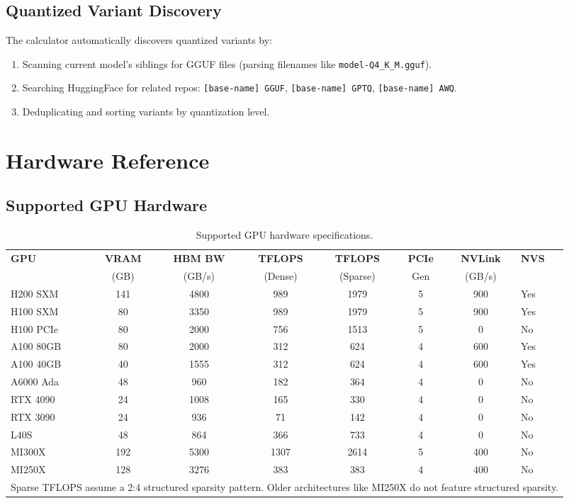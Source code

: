 \documentclass[11pt,a4paper]{article}
\theoremstyle{definition}
\begin{document}
\subsection{Quantized Variant Discovery}

The calculator automatically discovers quantized variants by:
\begin{enumerate}
  \item Scanning current model's siblings for GGUF files (parsing filenames like \texttt{model-Q4\_K\_M.gguf}).
  \item Searching HuggingFace for related repos: \texttt{[base-name] GGUF}, \texttt{[base-name] GPTQ}, \texttt{[base-name] AWQ}.
  \item Deduplicating and sorting variants by quantization level.
\end{enumerate}

\section{Hardware Reference}

\subsection{Supported GPU Hardware}

\begin{table}[htbp]
\centering
\caption{Supported GPU hardware specifications.}\label{tab:gpus}
\begin{tabularx}{\textwidth}{lccccccX}
\toprule
\textbf{GPU} & \textbf{VRAM} & \textbf{HBM BW} & \textbf{TFLOPS} & \textbf{TFLOPS} & \textbf{PCIe} & \textbf{NVLink} & \textbf{NVS} \\
 & (GB) & (GB/s) & (Dense) & (Sparse) & Gen & (GB/s) & \\
\midrule
H200 SXM  & 141 & 4800 & 989  & 1979 & 5 & 900 & Yes \\
H100 SXM  & 80  & 3350 & 989  & 1979 & 5 & 900 & Yes \\
H100 PCIe & 80  & 2000 & 756  & 1513 & 5 & 0   & No  \\
A100 80GB & 80  & 2000 & 312  & 624  & 4 & 600 & Yes \\
A100 40GB & 40  & 1555 & 312  & 624  & 4 & 600 & Yes \\
A6000 Ada & 48  & 960  & 182  & 364  & 4 & 0   & No  \\
RTX 4090  & 24  & 1008 & 165  & 330  & 4 & 0   & No  \\
RTX 3090  & 24  & 936  & 71   & 142  & 4 & 0   & No  \\
L40S      & 48  & 864  & 366  & 733  & 4 & 0   & No  \\
MI300X    & 192 & 5300 & 1307 & 2614 & 5 & 400 & No  \\
MI250X    & 128 & 3276 & 383  & 383  & 4 & 400 & No  \\
\bottomrule
\multicolumn{8}{l}{\footnotesize *Sparse TFLOPS assume a 2:4 structured sparsity pattern. Older architectures like MI250X do not feature structured sparsity.} \\
\end{tabularx}
\end{table}
\end{document}
